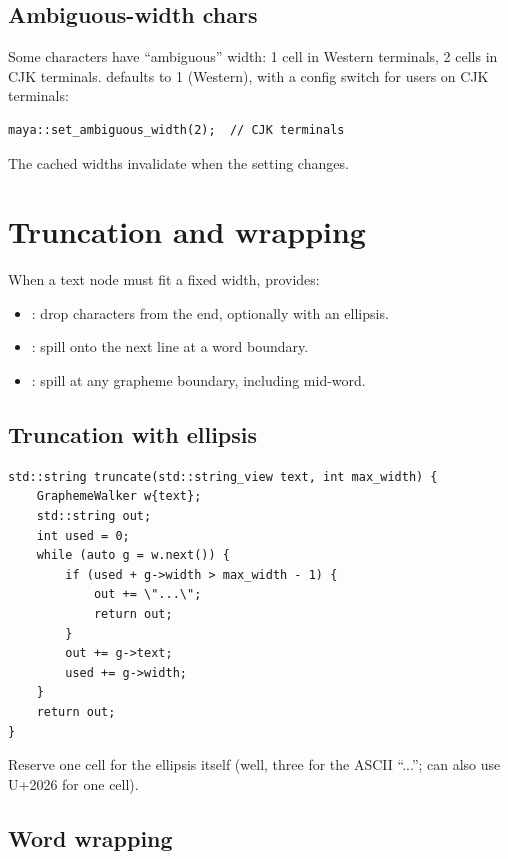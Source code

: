 \subsection*{Ambiguous-width chars}

Some characters have ``ambiguous'' width: 1 cell in Western
terminals, 2 cells in CJK terminals. \maya{} defaults to 1
(Western), with a config switch for users on CJK terminals:

\begin{lstlisting}
maya::set_ambiguous_width(2);  // CJK terminals
\end{lstlisting}

The cached widths invalidate when the setting changes.

\section{Truncation and wrapping}

When a text node must fit a fixed width, \maya{} provides:

\begin{itemize}[leftmargin=*]
  \item {}: drop characters from the end,
    optionally with an ellipsis.
  \item {}: spill onto the next line at a
    word boundary.
  \item {}: spill at any grapheme
    boundary, including mid-word.
\end{itemize}

\subsection*{Truncation with ellipsis}

\begin{lstlisting}
std::string truncate(std::string_view text, int max_width) {
    GraphemeWalker w{text};
    std::string out;
    int used = 0;
    while (auto g = w.next()) {
        if (used + g->width > max_width - 1) {
            out += \"...\";
            return out;
        }
        out += g->text;
        used += g->width;
    }
    return out;
}
\end{lstlisting}

Reserve one cell for the ellipsis itself (well, three for the
ASCII ``...''; \maya{} can also use U+2026 for one cell).

\subsection*{Word wrapping}


